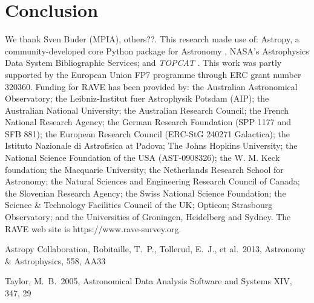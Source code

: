 \documentclass[preprint2,trackchanges]{aastex}
\newcommand{\project}[1]{\textsl{#1}}
\newcommand{\logg}{\log g}
\newcommand{\teff}{T_{\mathrm{eff}}}
\newcommand{\Nstars}{483,330}
\begin{document}
\section{Conclusion}
\label{sec:conclusion}


\acknowledgements
We thank Sven Buder (MPIA), others??.
This research made use of: Astropy, a community-developed core Python package for
Astronomy \citep{astropy}, NASA's Astrophysics Data System Bibliographic Services;
 and \project{TOPCAT} \citep{Taylor2005}.
This work was partly supported by the European Union FP7 programme through ERC 
grant number 320360.
Funding for RAVE has been provided by: the Australian Astronomical Observatory; the Leibniz-Institut fuer Astrophysik Potsdam (AIP); the Australian National University; the Australian Research Council; the French National Research Agency; the German Research Foundation (SPP 1177 and SFB 881); the European Research Council (ERC-StG 240271 Galactica); the Istituto Nazionale di Astrofisica at Padova; The Johns Hopkins University; the National Science Foundation of the USA (AST-0908326); the W. M. Keck foundation; the Macquarie University; the Netherlands Research School for Astronomy; the Natural Sciences and Engineering Research Council of Canada; the Slovenian Research Agency; the Swiss National Science Foundation; the Science \& Technology Facilities Council of the UK; Opticon; Strasbourg Observatory; and the Universities of Groningen, Heidelberg and Sydney. The RAVE web site is https://www.rave-survey.org.  



\begin{thebibliography}{dummy}
 Astropy Collaboration, Robitaille, T.~P., Tollerud, E.~J., et al.\ 2013, Astronomy \& Astrophysics, 558, AA33

 Taylor, M.~B.\ 2005, Astronomical Data Analysis Software and Systems XIV, 347, 29 

\end{thebibliography}
\end{document}
